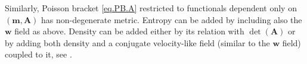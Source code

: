 \documentclass[
10pt, %
a4paper, %
oneside, %
headinclude,footinclude, %
BCOR5mm, %
]{scrartcl}
\newcommand{\mm}{\mathbf{m}}
\renewcommand{\AA}{\mathbf{A}}
\newcommand{\qq}{\mathbf{q}}
\newcommand{\ww}{\mathbf{w}}
\newcommand{\MP}[1]{{\color{OliveGreen}MP:\ \ #1}}
\newcommand{\IP}[1]{{\color{Red}IP:\ \ #1}}
\newcommand{\pd}{\partial}
\begin{document}
Similarly, Poisson bracket \eqref{eq.PB.A} restricted to functionals dependent only on $(\mm,\AA)$ 
has non-degenerate metric. Entropy can be added by including also the $\ww$ field as above. Density 
can be added either by its relation with $\det (\AA)$ or by adding both density and a conjugate 
velocity-like field (similar to the $\ww$ field) coupled to it, see \cite{Peshkov-Grmela}. 
\end{document}
